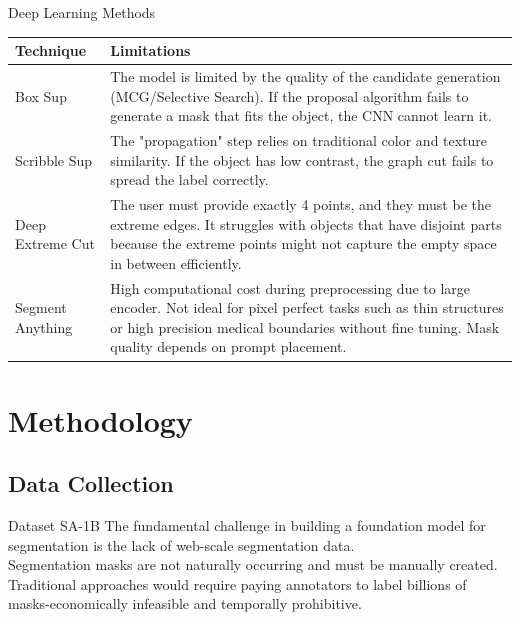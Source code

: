 \documentclass[11pt, aspectratio=169]{beamer}
\begin{document}
\begin{frame}{Deep Learning Methods} %
	\begin{table}[h]
		\centering
		\begin{tabular}{|l|p{11cm}|}
			\hline
			\textbf{Technique} & \textbf{Limitations} \\ \hline
			
			Box Sup
			& The model is limited by the quality of the candidate generation (MCG/Selective Search). If the proposal algorithm fails to generate a mask that fits the object, the CNN cannot learn it. \\ \hline
			
			Scribble Sup
			& The "propagation" step relies on traditional color and texture similarity. If the object has low contrast, the graph cut fails to spread the label correctly. \\ \hline
			
			Deep Extreme Cut
			& The user must provide exactly 4 points, and they must be the extreme edges. It struggles with objects that have disjoint parts because the extreme points might not capture the empty space in between efficiently. \\ \hline
			
			Segment Anything
			& High computational cost during preprocessing due to large encoder. Not ideal for pixel perfect tasks such as thin structures or high precision medical boundaries without fine tuning. Mask quality depends on prompt placement. \\ \hline
			
		\end{tabular}
	\end{table}
	
\end{frame}

\section{Methodology}
\subsection{Data Collection}
\begin{frame}{Dataset SA-1B}
	The fundamental challenge in building a foundation model for segmentation is the lack of web-scale segmentation data.\\
	Segmentation masks are not naturally occurring and must be manually created.\\
	Traditional approaches would require paying annotators to label billions of masks-economically infeasible and temporally prohibitive.
\end{frame}
\end{document}
